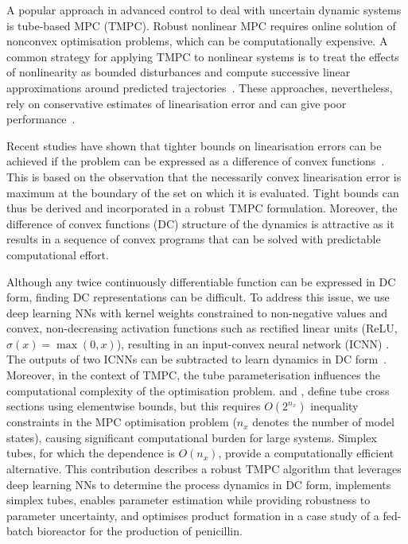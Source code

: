 \documentclass[final,5p,times,twocolumn,authoryear]{elsarticle}
\begin{document}
A popular approach in advanced control to deal with uncertain dynamic systems is tube-based MPC (TMPC). Robust nonlinear MPC requires online solution of nonconvex optimisation problems, which can be computationally expensive. A common strategy for applying TMPC to nonlinear systems is to treat the effects of nonlinearity as bounded disturbances and compute successive linear approximations around predicted trajectories~\citep{cannon11}. These approaches, nevertheless, rely on conservative estimates of linearisation error and can give poor performance~\citep{yu13}.

Recent studies have shown that tighter bounds on linearisation errors can be achieved if the problem can be expressed as a difference of convex functions~\citep{doff-sotta22,buerger24}. This is based on the observation that the necessarily convex linearisation error is maximum at the boundary of the set on which it is evaluated. Tight bounds can thus be derived and incorporated in a robust TMPC formulation. Moreover, the difference of convex functions (DC) structure of the dynamics is attractive as it results in a sequence of convex programs that can be solved with predictable computational effort.

Although any twice continuously differentiable function can be expressed in DC form, finding DC representations can be difficult. To address this issue, we use deep learning NNs with kernel weights constrained to non-negative values and convex, non-decreasing activation functions such as rectified linear units (ReLU, $\sigma(x) = \max(0,x)$), resulting in an input-convex neural network (ICNN) \citep{amos17}. The outputs of two ICNNs can be subtracted to learn dynamics in DC form~\citep{sankaranarayanan22}. Moreover, in the context of TMPC, the tube parameterisation influences the computational complexity of the optimisation problem. \citet{doff-sotta22} and \citet{buerger24}, define tube cross sections using elementwise bounds, but this requires $O(2^{n_x})$ 
inequality constraints in the MPC optimisation problem ($n_x$ denotes the number of model states),
causing significant computational burden for large systems.
Simplex tubes, for which the dependence is $O(n_x)$,
provide a computationally efficient alternative. 
%
This contribution describes a robust TMPC algorithm that leverages deep learning NNs to determine the process dynamics in DC form, implements simplex tubes, enables parameter estimation while providing robustness to parameter uncertainty,
and optimises product formation in a case study of a fed-batch bioreactor for the production of penicillin. 
\end{document}

